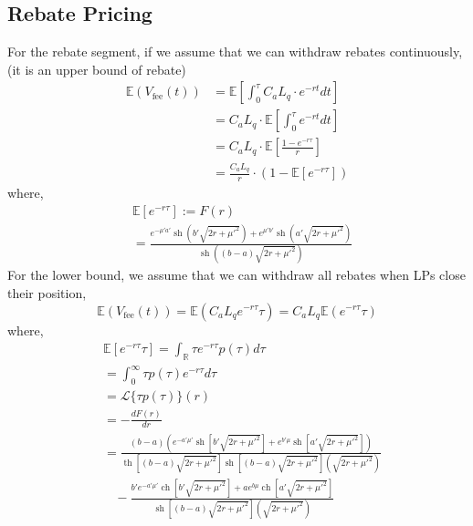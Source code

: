 \documentclass[conference]{IEEEtran}
\begin{document}
\subsection{Rebate Pricing}
For the rebate segment, if we assume that we can withdraw rebates continuously,(it is an upper bound of rebate)
$$
\begin{aligned}
\mathbb E(V_{\text{fee}}(t)) & =\mathbb{E}\left[\int_0^\tau C_aL_q \cdot e^{-r t} d t\right] \\
& =C_aL_q \cdot \mathbb{E}\left[\int_0^\tau e^{-r t} d t\right] \\
& =C_aL_q \cdot \mathbb{E}\left[\frac{1-e^{-r \tau}}{r}\right] \\
& =\frac{C_aL_q}{r} \cdot (1-\mathbb{E}\left[{e^{-r \tau}}\right])
\end{aligned}
$$
where,
$$
\begin{aligned}
&\mathbb{E} [e^{-r \tau}]:=F(r)\\
&=\frac{e^{-\mu'a'} \operatorname{sh}\left(b' \sqrt{2 r+\mu'^2}\right)+e^{\mu' b'} \operatorname{sh}\left(a' \sqrt{2 r+\mu'^2}\right)}{\operatorname{sh}\left((b-a) \sqrt{2 r+\mu'^2}\right)}
\end{aligned}
$$
For the lower bound, we assume that we can withdraw all rebates when LPs close their position,
$$
\mathbb E(V_{\text{fee}}(t)) = \mathbb E(C_aL_qe^{-r\tau}\tau) = C_aL_q\mathbb E(e^{-r\tau}\tau)
$$
where,
$$
\begin{aligned}
&\mathbb E[e^{-r\tau}\tau]= \int_{\mathbb R}\tau e^{-r\tau}p(\tau)d\tau\\
 &=\int_{0}^{\infty}\tau p(\tau)e^{-r\tau}d\tau\\
 &= \mathcal L\{\tau p(\tau)\}(r)\\
 &= -\frac{d F(r)}{dr}\\
&=\frac{(b-a)(e^{-a'\mu'}\operatorname{sh}[b'\sqrt{2r+\mu'^2}]+e^{b'\mu}\operatorname{sh}[a'\sqrt{2r+\mu'^2}])}{\operatorname{th}[(b-a)\sqrt{2r+\mu'^2}]\operatorname{sh}[(b-a)\sqrt{2r+\mu'^2}](\sqrt{2r+\mu'^2}) }
 \\& \ \ \ \ -
\frac{b' e^{-a'\mu'}\operatorname{ch}[b'\sqrt{2r+\mu'^2}]+ae^{b\mu}\operatorname{ch}[a'\sqrt{2r+\mu'^2}]}{\operatorname{sh}[(b-a)\sqrt{2r+\mu'^2}](\sqrt{2r+\mu'^2})}
\end{aligned}
$$
\end{document}
